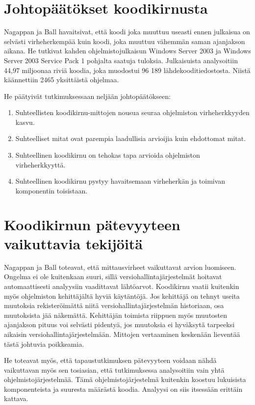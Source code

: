 \documentclass[finnish]{../tktltiki2}
\theoremstyle{definition}
\theoremstyle{remark}
\begin{document}
\section{Johtopäätökset koodikirnusta}

Nagappan ja Ball havaitsivat, että koodi joka muuttuu useasti ennen julkaisua on selvästi virheherkempää kuin koodi, joka muuttuu vähemmän saman ajanjakson aikana. He tutkivat kahden ohjelmistojulkaisun Windows Server 2003 ja Windows Server 2003 Service Pack 1 pohjalta saatuja tuloksia. Julkaisuista analysoitiin 44,97 miljoonaa riviä koodia, joka muodostui 96 189 lähdekooditiedostosta. Niistä käännettiin 2465 yksittäistä ohjelmaa.\newline

\noindent He päätyivät tutkimuksessaan neljään johtopäätökseen:

\begin{enumerate}
    \item Suhteellisten koodikirnu-mittojen nousua seuraa ohjelmiston virheherkkyyden kasvu.
    \item Suhteelliset mitat ovat parempia laadullisia arvioijia kuin ehdottomat mitat.
    \item Suhteellinen koodikirnu on tehokas tapa arvioida ohjelmiston virheherkkyyttä.
    \item Suhteellinen koodikirnu pystyy havaitsemaan virheherkän ja toimivan komponentin toisistaan.
\end{enumerate}

\section{Koodikirnun pätevyyteen vaikuttavia tekijöitä}

Nagappan ja Ball toteavat, että mittausvirheet vaikuttavat arvion luomiseen. Ongelma ei ole kuitenkaan suuri, sillä versiohallintajärjestelmät hoitavat automaattisesti analyysiin vaadittavat lähtöarvot. Koodikirnu vaatii kuitenkin myös ohjelmiston kehittäjältä hyviä käytäntöjä. Jos kehittäjä on tehnyt useita muutoksia rekisteröimättä niitä versiohallintajärjestelmän historiaan, osa muutoksista jää näkemättä. Kehittäjän toimista riippuen myös muutosten ajanjakson pituus voi selvästi pidentyä, jos muutoksia ei hyväksytä tarpeeksi aikaisin versiohallintajärjestelmään. Mittojen vertaaminen keskenään lieventää tästä johtuvia poikkeamia.

He toteavat myös, että tapaustutkimuksen pätevyyteen voidaan nähdä vaikuttavan myös sen tosiasian, että tutkimuksessa analysoitiin vain yhtä ohjelmistojärjestelmää. Tämä ohjelmistojärjestelmä kuitenkin koostuu lukuisista komponenteista ja suuresta määrästä koodia. Analyysi on siis itsessään erittäin kattava.
\end{document}
